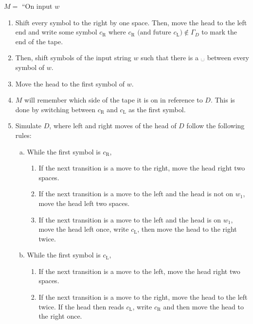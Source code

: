 \documentclass{article}
\newcommand\blanksymbol\textvisiblespace
\begin{document}
    $M = $ ``On input $w$
    \begin{enumerate}
        \item Shift every symbol to the right by one space. Then, move the head to the left end and write some symbol $c_\text{R}$ where $c_\text{R} \text{ (and future $c_\text{L}$)} \notin \Gamma_D$ to mark the end of the tape. 

        \item Then, shift symbols of the input string $w$ such that there is a $\text{\blanksymbol} $ between every symbol of $w$.

        \item Move the head to the first symbol of $w$.

        \item $M$ will remember which side of the tape it is on in reference to $D$. This is done by switching between $c_\text{R}$ and $c_\text{L}$ as the first symbol. 

        \item Simulate $D$, where left and right moves of the head of $D$ follow the following rules:
            \begin{enumerate}[a.]

                \item While the first symbol is $c_\text{R}$,
                    \begin{enumerate}
                        \item If the next transition is a move to the right, move the head right two spaces.

                        \item If the next transition is a move to the left and the head is not on $w_1$, move the head left two spaces.

                        \item If the next transition is a move to the left and the head is on $w_1$, move the head left once, write $c_\text{L}$, then move the head to the right twice.
                    \end{enumerate}

                \item While the first symbol is $c_\text{L}$,
                    \begin{enumerate}
                        \item If the next transition is a move to the left, move the head right two spaces.

                        \item If the next transition is a move to the right, move the head to the left twice. If the head then reads $c_\text{L}$, write $c_\text{R}$ and then move the head to the right once.
                    \end{enumerate}

            \end{enumerate}
    \end{enumerate}
\end{document}
